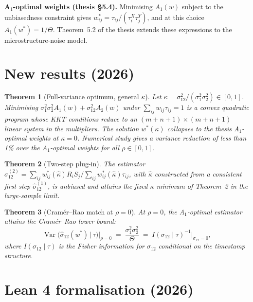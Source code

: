 \documentclass[11pt]{article}
\newtheorem{theorem}{Theorem}
\begin{document}
\textbf{A$_1$-optimal weights (thesis \S 5.4).}
Minimising $A_1(w)$ subject to the unbiasedness constraint gives
$w^*_{ij} = \tau_{ij} / (\tau_i^X \tau_j^Y)$, and at this choice
$A_1(w^*) = 1/\Theta$. Theorem~5.2 of the thesis extends these
expressions to the microstructure-noise model.

\section*{New results (2026)}

\begin{theorem}[Full-variance optimum, general $\kappa$]
Let $\kappa = \sigma_{12}^2 / (\sigma_1^2 \sigma_2^2) \in [0, 1]$.
Minimising $\sigma_1^2 \sigma_2^2 A_1(w) + \sigma_{12}^2 A_2(w)$
under $\sum_{ij} w_{ij} \tau_{ij} = 1$ is a convex quadratic
program whose KKT conditions reduce to an $(m + n + 1) \times
(m + n + 1)$ linear system in the multipliers. The solution
$w^*(\kappa)$ collapses to the thesis A$_1$-optimal weights at
$\kappa = 0$. Numerical study gives a variance reduction of less
than 1\% over the A$_1$-optimal weights for all $\rho \in [0,1]$.
\end{theorem}

\begin{theorem}[Two-step plug-in]
The estimator
$\hat\sigma_{12}^{(2)} = \sum_{ij} w_{ij}^*(\hat\kappa) R_i S_j
/ \sum_{ij} w_{ij}^*(\hat\kappa) \tau_{ij}$, with
$\hat\kappa$ constructed from a consistent first-step $\hat\sigma_{12}^{(1)}$,
is unbiased and attains the fixed-$\kappa$ minimum of
Theorem~2 in the large-sample limit.
\end{theorem}

\begin{theorem}[Cram\'er--Rao match at $\rho = 0$]
At $\rho = 0$, the A$_1$-optimal estimator attains the Cram\'er--Rao
lower bound:
\[
\operatorname{Var}\!\big(\hat\sigma_{12}(w^*) \,\big|\, \tau\big)\Big|_{\rho=0}
\;=\; \frac{\sigma_1^2 \sigma_2^2}{\Theta}
\;=\; I(\sigma_{12} \mid \tau)^{-1}\big|_{\sigma_{12} = 0},
\]
where $I(\sigma_{12} \mid \tau)$ is the Fisher information for
$\sigma_{12}$ conditional on the timestamp structure.
\end{theorem}

\section*{Lean 4 formalisation (2026)}
\end{document}
